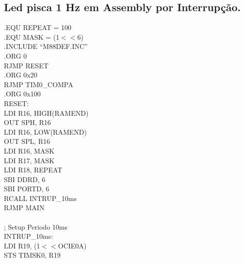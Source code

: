 \documentclass[titlepage, a4paper, 10pt, reqno, openany]{report}
\begin{document}
	\subsection {Led pisca 1 Hz em Assembly por Interrup\c{c}\~{a}o.}
\begin{minipage}[T]{.3\linewidth}
.EQU REPEAT = 100 \\
.EQU MASK = (1$<<$6) \\
.INCLUDE \textquotedblleft M88DEF.INC\textquotedblright \\[0.5ex]
.ORG 0 \\
\hspace*{.5cm}	RJMP RESET \\
.ORG 0x20 \\
\hspace*{.5cm}	RJMP TIM0\_COMPA \\
.ORG 0x100 \\
RESET: \\
\hspace*{.5cm}	LDI R16, HIGH(RAMEND) \\
\hspace*{.5cm}	OUT SPH, R16 \\
\hspace*{.5cm}	LDI R16, LOW(RAMEND) \\
\hspace*{.5cm}	OUT SPL, R16 \\
\hspace*{.5cm}	LDI R16, MASK \\
\hspace*{.5cm}	LDI R17, MASK \\
\hspace*{.5cm}	LDI R18, REPEAT \\
\hspace*{.5cm}	SBI DDRD, 6 \\
\hspace*{.5cm}	SBI PORTD, 6 \\
\hspace*{.5cm}	RCALL INTRUP\_10ms \\
\hspace*{.5cm}	RJMP MAIN \\
\hspace*{.5cm}	\\
; Setup Periodo 10ms \\
INTRUP\_10ms: \\
\hspace*{.5cm}	LDI R19, (1$<<$OCIE0A) \\
\hspace*{.5cm}	STS TIMSK0, R19 \\

\end{minipage}
\end{document}
